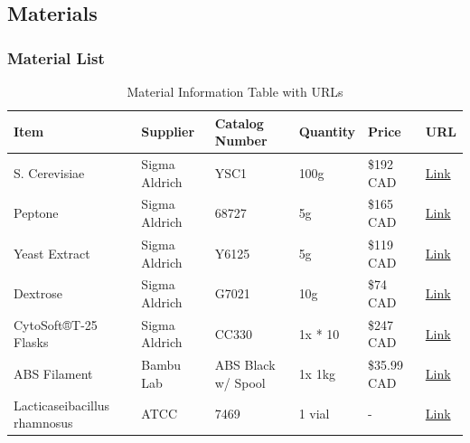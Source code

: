 \documentclass[final, 3p, 11pt]{elsarticle}
\begin{document}
\subsection{Materials}
\subsubsection{Material List}
\begin{table}[ht]
        \centering
        \begin{tabular}{l l l l l l}
        \toprule
        Item & Supplier & Catalog Number & Quantity & Price & URL \\
        \midrule
        S. Cerevisiae & Sigma Aldrich & YSC1 & 100g & \$192 CAD & \href{https://www.sigmaaldrich.com/CA/en/product/sigma/ysc1}{Link} \\
        Peptone & Sigma Aldrich & 68727 & 5g & \$165 CAD & \href{https://www.sigmaaldrich.com/CA/en/product/sial/68727?icid=sharepdp-clipboard-copy-productdetailpage}{Link} \\
        Yeast Extract & Sigma Aldrich & Y6125 & 5g & \$119 CAD & \href{https://www.sigmaaldrich.com/CA/en/product/sigma/y1625?icid=sharepdp-clipboard-copy-productdetailpage}{Link} \\
        Dextrose & Sigma Aldrich & G7021 & 10g & \$74 CAD & \href{https://www.sigmaaldrich.com/CA/en/search/dextrose?focus=products&page=1&perpage=30&sort=relevance&term=dextrose&type=product}{Link} \\
        CytoSoft®T-25 Flasks & Sigma Aldrich & CC330 & 1x * 10 & \$247 CAD & \href{https://www.sigmaaldrich.com/CA/en/product/mm/cc330}{Link} \\
        ABS Filament & Bambu Lab & ABS Black w/ Spool & 1x 1kg & \$35.99 CAD & \href{https://ca.store.bambulab.com/products/abs-filament?variant=44183939580144}{Link} \\
        Lacticaseibacillus rhamnosus & ATCC & 7469 & 1 vial & - & \href{https://www.atcc.org/products/7469}{Link} \\
        \bottomrule
        \end{tabular}
        \caption{Material Information Table with URLs}
        \label{tab:matinfo}
        \end{table}
\end{document}
